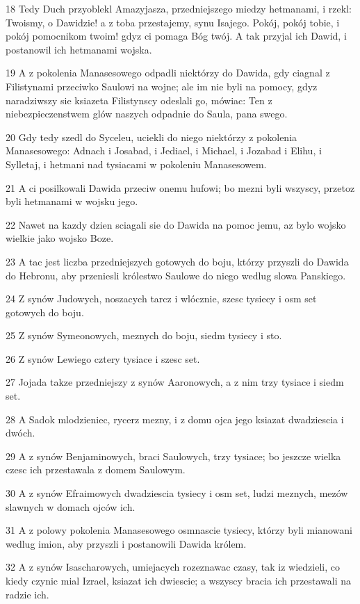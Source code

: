\par 18 Tedy Duch przyoblekl Amazyjasza, przedniejszego miedzy hetmanami, i rzekl: Twoismy, o Dawidzie! a z toba przestajemy, synu Isajego. Pokój, pokój tobie, i pokój pomocnikom twoim! gdyz ci pomaga Bóg twój. A tak przyjal ich Dawid, i postanowil ich hetmanami wojska.
\par 19 A z pokolenia Manasesowego odpadli niektórzy do Dawida, gdy ciagnal z Filistynami przeciwko Saulowi na wojne; ale im nie byli na pomocy, gdyz naradziwszy sie ksiazeta Filistynscy odeslali go, mówiac: Ten z niebezpieczenstwem glów naszych odpadnie do Saula, pana swego.
\par 20 Gdy tedy szedl do Syceleu, uciekli do niego niektórzy z pokolenia Manasesowego: Adnach i Josabad, i Jediael, i Michael, i Jozabad i Elihu, i Sylletaj, i hetmani nad tysiacami w pokoleniu Manasesowem.
\par 21 A ci posilkowali Dawida przeciw onemu hufowi; bo mezni byli wszyscy, przetoz byli hetmanami w wojsku jego.
\par 22 Nawet na kazdy dzien sciagali sie do Dawida na pomoc jemu, az bylo wojsko wielkie jako wojsko Boze.
\par 23 A tac jest liczba przedniejszych gotowych do boju, którzy przyszli do Dawida do Hebronu, aby przeniesli królestwo Saulowe do niego wedlug slowa Panskiego.
\par 24 Z synów Judowych, noszacych tarcz i wlócznie, szesc tysiecy i osm set gotowych do boju.
\par 25 Z synów Symeonowych, meznych do boju, siedm tysiecy i sto.
\par 26 Z synów Lewiego cztery tysiace i szesc set.
\par 27 Jojada takze przedniejszy z synów Aaronowych, a z nim trzy tysiace i siedm set.
\par 28 A Sadok mlodzieniec, rycerz mezny, i z domu ojca jego ksiazat dwadziescia i dwóch.
\par 29 A z synów Benjaminowych, braci Saulowych, trzy tysiace; bo jeszcze wielka czesc ich przestawala z domem Saulowym.
\par 30 A z synów Efraimowych dwadziescia tysiecy i osm set, ludzi meznych, mezów slawnych w domach ojców ich.
\par 31 A z polowy pokolenia Manasesowego osmnascie tysiecy, którzy byli mianowani wedlug imion, aby przyszli i postanowili Dawida królem.
\par 32 A z synów Isascharowych, umiejacych rozeznawac czasy, tak iz wiedzieli, co kiedy czynic mial Izrael, ksiazat ich dwiescie; a wszyscy bracia ich przestawali na radzie ich.
